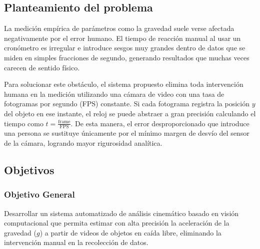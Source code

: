 \documentclass[12pt,a4paper]{article}
\begin{document}
\subsection{Planteamiento del problema}
La medición empírica de parámetros como la gravedad suele verse afectada negativamente por el error humano. El tiempo de reacción manual al usar un cronómetro es irregular e introduce sesgos muy grandes dentro de datos que se miden en simples fracciones de segundo, generando resultados que muchas veces carecen de sentido físico.

Para solucionar este obstáculo, el sistema propuesto elimina toda intervención humana en la medición utilizando una cámara de video con una tasa de fotogramas por segundo (FPS) constante. Si cada fotograma registra la posición $y$ del objeto en ese instante, el reloj se puede abstraer a gran precisión calculando el tiempo como $t = \frac{\text{frame}}{\text{FPS}}$. De esta manera, el error desproporcionado que introduce una persona se sustituye únicamente por el mínimo margen de desvío del sensor de la cámara, logrando mayor rigurosidad analítica.

\subsection{Objetivos}

\subsubsection{Objetivo General}
Desarrollar un sistema automatizado de análisis cinemático basado en visión computacional que permita estimar con alta precisión la aceleración de la gravedad ($g$) a partir de videos de objetos en caída libre, eliminando la intervención manual en la recolección de datos.
\end{document}
